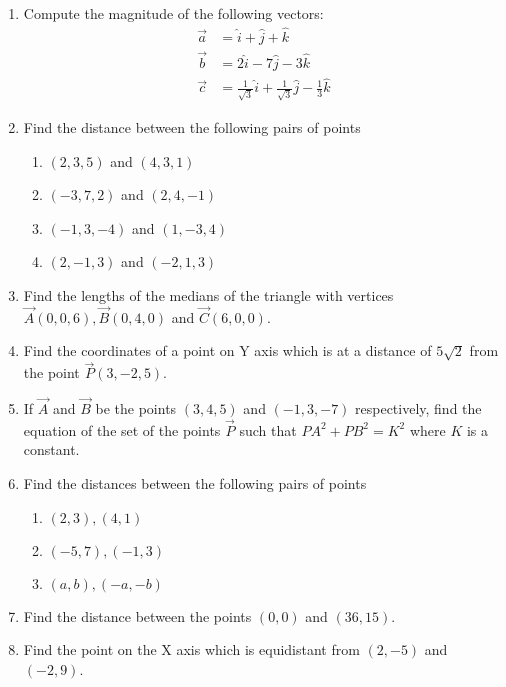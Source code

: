 \begin{enumerate}[label=\thesubsection.\arabic*, ref=\thesubsection.\theenumi]
\item Compute the magnitude of the following vectors:
\begin{align}
	\vec{a}&=\hat{i}+\hat{j}+\hat{k}
	\\
	\vec{b}&=2\hat{i}-7\hat{j}-3\hat{k}
	\\
	\vec{c}&=\frac{1}{\sqrt{3}}\hat{i}+\frac{1}{\sqrt{3}}\hat{j}-\frac{1}{3}\hat{k}
\end{align}
    \solution 
		
\item Find the distance between the following pairs of points
\begin{enumerate}[label=(\roman*)]
\item $(2, 3, 5)$ and $(4, 3, 1)$
\item $(-3, 7, 2)$ and $(2, 4, -1)$
\item $(-1, 3, -4)$ and $(1, -3, 4)$
\item $(2, -1, 3)$ and $(-2, 1, 3)$
\end{enumerate}
\item Find the lengths of the medians of the triangle with vertices $\vec{A}(0, 0, 6),  \vec{B}(0, 4, 0)$ and $\vec{C}(6, 0, 0)$.
\item Find the coordinates of a point on Y axis which is at a distance of $5\sqrt2$ from the point $\vec{P}(3, -2, 5)$.
\item If $\vec{A}$ and $\vec{B}$ be the points $(3, 4, 5)$ and $(-1, 3, -7)$ respectively,  find the equation of the set of the points $\vec{P}$ such that $PA^2+PB^2=K^2$ where $K$ is a constant.
\item Find the distances between the following pairs of points
\begin{enumerate}
\item $(2, 3), (4, 1)$
\item $(-5, 7), (-1, 3)$
\item $(a, b), (-a, -b)$
\end{enumerate}
\solution
		
\item Find the distance between the points $(0, 0)$ and $ (36, 15)$.
	\\
		\solution
		
\item Find the point on the X axis which is equidistant from $(2, -5)$ and $(-2, 9)$.
	\label{it:10/7/1/7}
	\\
\solution
		

\end{enumerate}
